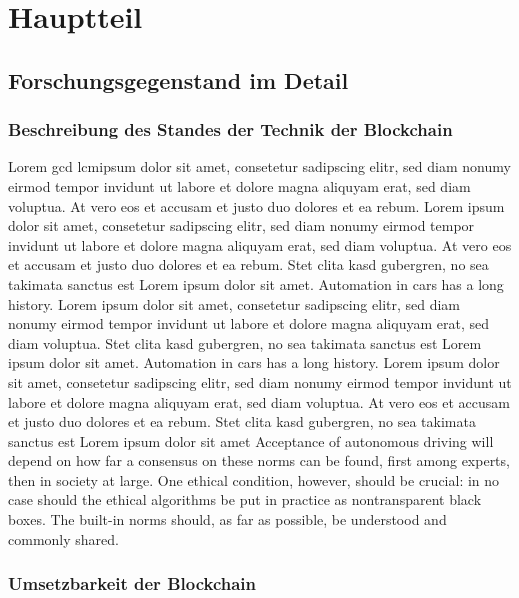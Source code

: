 \newpage
\chapter{Hauptteil}

\section{Forschungsgegenstand im Detail}
\subsection{Beschreibung des Standes der Technik der Blockchain}

Lorem \gls{gcd} \gls{lcm}ipsum dolor sit amet, consetetur sadipscing elitr, sed diam nonumy eirmod tempor invidunt ut labore et dolore magna aliquyam erat, sed diam voluptua.
At vero eos et accusam et justo duo dolores et ea rebum.
Lorem ipsum dolor sit amet, consetetur sadipscing elitr, sed diam nonumy eirmod tempor invidunt ut labore et dolore magna aliquyam erat, sed diam voluptua.
At vero eos et accusam et justo duo dolores et ea rebum.
Stet clita kasd gubergren, no sea takimata sanctus est Lorem ipsum dolor sit amet.
Automation in cars has a long history.  Lorem ipsum dolor sit amet, consetetur sadipscing elitr, sed diam nonumy eirmod tempor invidunt ut labore et dolore magna aliquyam erat, sed diam voluptua.
Stet clita kasd gubergren, no sea takimata sanctus est Lorem ipsum dolor sit amet.
Automation in cars has a long history.  Lorem ipsum dolor sit amet, consetetur sadipscing elitr, sed diam nonumy eirmod tempor invidunt ut labore et dolore magna aliquyam erat, sed diam voluptua.
At vero eos et accusam et justo duo dolores et ea rebum.
Stet clita kasd gubergren, no sea takimata sanctus est Lorem ipsum dolor sit amet Acceptance of autonomous driving will depend on how far a consensus on these norms can be found, first among experts, then in society at large.
One ethical condition, however, should be crucial: in no case should the ethical algorithms be put in practice as nontransparent black boxes.
The built-in norms should, as far as possible, be understood and commonly shared.

\subsection{Umsetzbarkeit der Blockchain}

